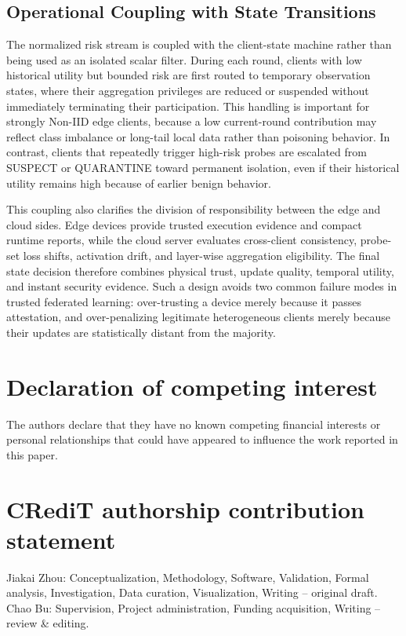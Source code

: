 \documentclass[final,5p,times,twocolumn]{elsarticle/elsarticle}
\begin{document}
\subsection{Operational Coupling with State Transitions}
The normalized risk stream is coupled with the client-state machine rather than being used as an isolated scalar filter. During each round, clients with low historical utility but bounded risk are first routed to temporary observation states, where their aggregation privileges are reduced or suspended without immediately terminating their participation. This handling is important for strongly Non-IID edge clients, because a low current-round contribution may reflect class imbalance or long-tail local data rather than poisoning behavior. In contrast, clients that repeatedly trigger high-risk probes are escalated from SUSPECT or QUARANTINE toward permanent isolation, even if their historical utility remains high because of earlier benign behavior.

This coupling also clarifies the division of responsibility between the edge and cloud sides. Edge devices provide trusted execution evidence and compact runtime reports, while the cloud server evaluates cross-client consistency, probe-set loss shifts, activation drift, and layer-wise aggregation eligibility. The final state decision therefore combines physical trust, update quality, temporal utility, and instant security evidence. Such a design avoids two common failure modes in trusted federated learning: over-trusting a device merely because it passes attestation, and over-penalizing legitimate heterogeneous clients merely because their updates are statistically distant from the majority.

\section*{Declaration of competing interest}
The authors declare that they have no known competing financial interests or personal relationships that could have appeared to influence the work reported in this paper.

\section*{CRediT authorship contribution statement}
Jiakai Zhou: Conceptualization, Methodology, Software, Validation, Formal analysis, Investigation, Data curation, Visualization, Writing -- original draft. Chao Bu: Supervision, Project administration, Funding acquisition, Writing -- review \& editing.
\end{document}

